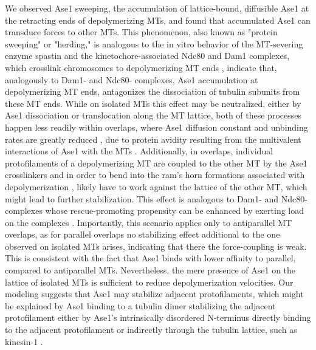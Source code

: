 We observed Ase1 sweeping, the accumulation of lattice-bound, diffusible Ase1 at the retracting ends of depolymerizing MTs, and found that accumulated Ase1 can transduce forces to other MTs. This phenomenon, also known as "protein sweeping" or "herding," is analogous to the in vitro behavior of the MT-severing enzyme spastin and the kinetochore-associated Ndc80 and Dam1 complexes, which crosslink chromosomes to depolymerizing MT ends \parencite{Franck2007, umbreit2012ndc80, grishchuk2017biophysics}, indicate that, analogously to Dam1- and Ndc80- complexes, Ase1 accumulation at depolymerizing MT ends, antagonizes the dissociation of tubulin subunits from these MT ends. While on isolated MTs this effect may be neutralized, either by Ase1 dissociation or translocation along the MT lattice, both of these processes happen less readily within overlaps, where Ase1 diffusion constant and unbinding rates are greatly reduced \parencite{Kapitein2008, lanskydiffusible2015}, due to protein avidity resulting from the multivalent interactions of Ase1 with the MTs \parencite{braun2020cytoskeletal, erlendsson2021binding}. Additionally, in overlaps, individual protofilaments of a depolymerizing MT are coupled to the other MT by the Ase1 crosslinkers and in order to bend into the ram's horn formations associated with depolymerization , likely have to work against the lattice of the other MT, which might lead to further stabilization. This effect is analogous to Dam1- and Ndc80- complexes whose rescue-promoting propensity can be enhanced by exerting load on the complexes \parencite{Franck2007, volkov2018multivalency}. Importantly, this scenario applies only to antiparallel MT overlaps, as for parallel overlaps no stabilizing effect additional to the one observed on isolated MTs arises, indicating that there the force-coupling is weak. This is consistent with the fact that Ase1 binds with lower affinity to parallel, compared to antiparallel MTs. Nevertheless, the mere presence of Ase1 on the lattice of isolated MTs is sufficient to reduce depolymerization velocities. Our modeling suggests that Ase1 may stabilize adjacent protofilaments, which might be explained by Ase1 binding to a tubulin dimer stabilizing the adjacent protofilament either by Ase1's intrinsically disordered N-terminus directly binding to the adjacent protofilament \parencite{Subramanian2010} or indirectly through the tubulin lattice, such as kinesin-1 \parencite{Peet2018, morikawa2015x}. \par

